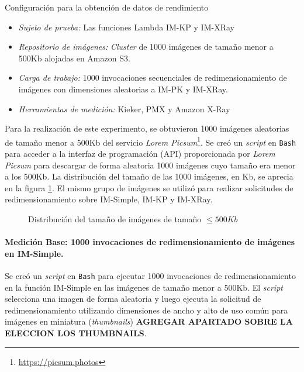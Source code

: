Configuración para la obtención de datos de rendimiento

\begin{itemize}
    \item \emph{Sujeto de prueba:} Las funciones Lambda IM-KP y IM-XRay
    \item \emph{Repositorio de imágenes:} \emph{Cluster} de 1000 imágenes de tamaño menor a 500Kb alojadas en Amazon S3.     
    \item \emph{Carga de trabajo:} 1000 invocaciones secuenciales de redimensionamiento de imágenes con dimensiones aleatorias a IM-PK y IM-XRay.
    \item \emph{Herramientas de medición:} Kieker, PMX y Amazon X-Ray
\end{itemize}

Para la realización de este experimento, se obtuvieron 1000 imágenes aleatorias de tamaño menor a 500Kb del servicio \emph{Lorem Picsum}\footnote{\url{https://picsum.photos}}. Se creó un \emph{script} en \texttt{Bash} para acceder a la interfaz de programación (API) proporcionada por \emph{Lorem Picsum} para descargar de forma aleatoria 1000 imágenes cuyo tamaño era menor a los 500Kb. La distribución del tamaño de las 1000 imágenes, en Kb, se aprecia en la figura \ref{fig:distribucion-tamanno-imagenes-hasta-500kb}. El mismo grupo de imágenes se utilizó para realizar solicitudes de redimensionamiento sobre IM-Simple, IM-KP y IM-XRay.

\begin{figure}
\caption{Distribución del tamaño de imágenes de tamaño $\leq 500Kb$}
\label{fig:distribucion-tamanno-imagenes-hasta-500kb}
\end{figure}

\paragraph{Medición Base: 1000 invocaciones de redimensionamiento de imágenes en IM-Simple.} 
Se creó un \emph{script} en \texttt{Bash} para ejecutar 1000 invocaciones de redimensionamiento en la función IM-Simple en las imágenes de tamaño menor a 500Kb. El \emph{script} selecciona una imagen de forma aleatoria y luego ejecuta la solicitud de redimensionamiento utilizando dimensiones de ancho y alto de uso común para imágenes en miniatura (\emph{thumbnails}) \textbf{AGREGAR APARTADO SOBRE LA ELECCION LOS THUMBNAILS}.

